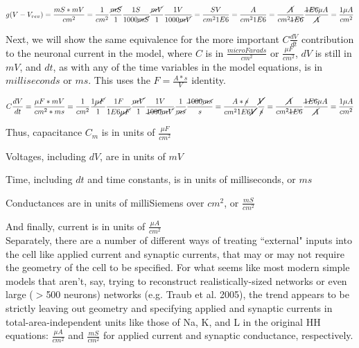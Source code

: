 \documentclass[letterpaper,onecolumn]{article}
\begin{document}
\begin{equation}
g(V-V_{rev}) = \frac{mS * mV}{cm^2} = \frac{1}{cm^2} \frac{\cancel{mS}}{1} \frac{1S}{1000\cancel{mS}} \frac{\cancel{mV}}{1} \frac{1V}{1000\cancel{mV}}
= \frac{SV}{cm^2 1E6} = \frac{A}{cm^2 1E6} = \frac{\cancel{A}}{cm^2 \cancel{1E6}} \frac{\cancel{1E6}\mu A}{\cancel{A}} = \frac{1 \mu A}{cm^2} 
\label{eqn:1_1}
\end{equation}

\indent Next, we will show the same equivalence for the more important $C \frac{dV}{dt}$ contribution to the neuronal current in the model, where $C$ is in $\frac{microFarads}{cm^2}$ or $\frac{\mu F}{cm^2}$, $dV$ is still in $mV$, and $dt$, as with any of the time variables in the model equations, is in $milliseconds$ or $ms$.
This uses the $F = \frac{A*s}{V}$ identity.

\begin{equation}
C\frac{dV}{dt} = \frac{\mu F * mV}{cm^2*ms} = \frac{1}{cm^2} \frac{1\cancel{\mu F}}{1} \frac{1 F}{1E6 \cancel{\mu F}} \frac{\cancel{mV}}{1} \frac{1V}{\cancel{1000}\cancel{mV}} \frac{1}{\cancel{ms}} \frac{\cancel{1000}\cancel{ms}}{s}
= \frac{A*\cancel{s}}{cm^2 1E6 \cancel{V}} \frac{\cancel{V}}{\cancel{s}}
= \frac{\cancel{A}}{cm^2 \cancel{1E6}} \frac{\cancel{1E6} \mu A}{\cancel{A}} = \frac{1 \mu A}{cm^2} 
\label{eqn:1_2}
\end{equation}

\indent Thus, capacitance $C_m$ is in units of $\frac{\mu F}{cm^2}$

Voltages, including $dV$, are in units of $mV$

Time, including $dt$ and time constants, is in units of milliseconds, or $ms$

Conductances are in units of milliSiemens over $cm^2$, or $\frac{mS}{cm^2}$

And finally, current is in units of $\frac{\mu A}{cm^2}$ \\

\indent Separately, there are a number of different ways of treating ``external" inputs into the cell like applied current and synaptic currents, that may or may not require the geometry of the cell to be specified.
For what seems like most modern simple models that aren't, say, trying to reconstruct realistically-sized networks or even large ($>$500 neurons) networks (e.g. Traub et al. 2005), the trend appears to be strictly leaving out geometry and specifying applied and synaptic currents in total-area-independent units like those of Na, K, and L in the original HH equations: $\frac{\mu A}{cm^2}$ and $\frac{mS}{cm^2}$ for applied current and synaptic conductance, respectively.
\end{document}
